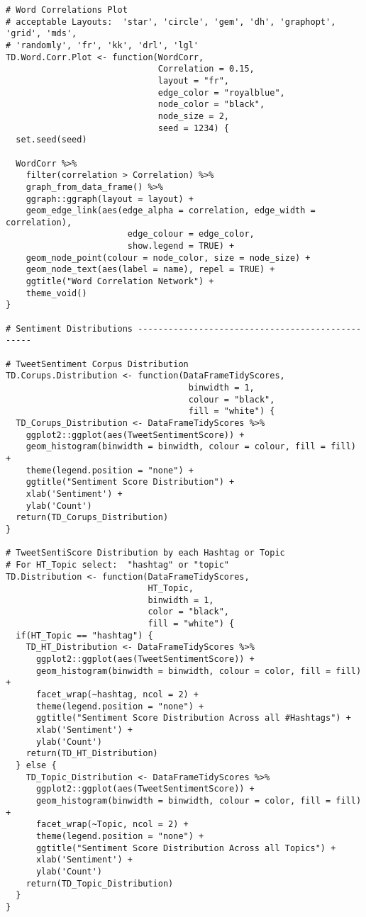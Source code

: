 \begin{lstlisting}
# Word Correlations Plot
# acceptable Layouts:  'star', 'circle', 'gem', 'dh', 'graphopt', 'grid', 'mds', 
# 'randomly', 'fr', 'kk', 'drl', 'lgl'
TD.Word.Corr.Plot <- function(WordCorr, 
                              Correlation = 0.15, 
                              layout = "fr", 
                              edge_color = "royalblue", 
                              node_color = "black", 
                              node_size = 2,  
                              seed = 1234) {
  set.seed(seed)
  
  WordCorr %>%
    filter(correlation > Correlation) %>%
    graph_from_data_frame() %>%
    ggraph::ggraph(layout = layout) +
    geom_edge_link(aes(edge_alpha = correlation, edge_width = correlation), 
                        edge_colour = edge_color, 
                        show.legend = TRUE) +
    geom_node_point(colour = node_color, size = node_size) +
    geom_node_text(aes(label = name), repel = TRUE) +
    ggtitle("Word Correlation Network") +
    theme_void()
}

# Sentiment Distributions -------------------------------------------------

# TweetSentiment Corpus Distribution
TD.Corups.Distribution <- function(DataFrameTidyScores, 
                                    binwidth = 1, 
                                    colour = "black", 
                                    fill = "white") {
  TD_Corups_Distribution <- DataFrameTidyScores %>% 
    ggplot2::ggplot(aes(TweetSentimentScore)) +
    geom_histogram(binwidth = binwidth, colour = colour, fill = fill) +
    theme(legend.position = "none") +
    ggtitle("Sentiment Score Distribution") +
    xlab('Sentiment') +
    ylab('Count')
  return(TD_Corups_Distribution)
}

# TweetSentiScore Distribution by each Hashtag or Topic
# For HT_Topic select:  "hashtag" or "topic"
TD.Distribution <- function(DataFrameTidyScores, 
                            HT_Topic, 
                            binwidth = 1, 
                            color = "black", 
                            fill = "white") {
  if(HT_Topic == "hashtag") {
    TD_HT_Distribution <- DataFrameTidyScores %>% 
      ggplot2::ggplot(aes(TweetSentimentScore)) +
      geom_histogram(binwidth = binwidth, colour = color, fill = fill) +
      facet_wrap(~hashtag, ncol = 2) +
      theme(legend.position = "none") +
      ggtitle("Sentiment Score Distribution Across all #Hashtags") +
      xlab('Sentiment') +
      ylab('Count')
    return(TD_HT_Distribution)
  } else {
    TD_Topic_Distribution <- DataFrameTidyScores %>% 
      ggplot2::ggplot(aes(TweetSentimentScore)) +
      geom_histogram(binwidth = binwidth, colour = color, fill = fill) +
      facet_wrap(~Topic, ncol = 2) +
      theme(legend.position = "none") +
      ggtitle("Sentiment Score Distribution Across all Topics") +
      xlab('Sentiment') +
      ylab('Count')
    return(TD_Topic_Distribution)
  }
}


\end{lstlisting}
